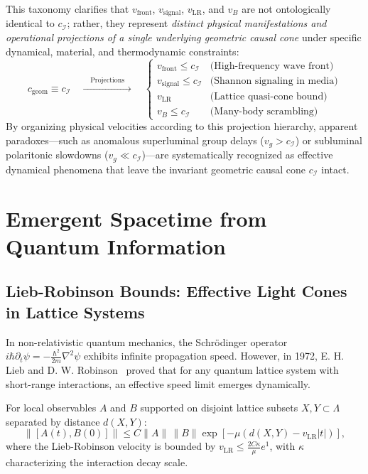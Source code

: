 \documentclass[11pt,a4paper]{article}
\begin{document}
This taxonomy clarifies that $v_{\text{front}}$, $v_{\text{signal}}$, $v_{\text{LR}}$, and $v_B$ are not ontologically identical to $c_{\mathcal{I}}$; rather, they represent \emph{distinct physical manifestations and operational projections of a single underlying geometric causal cone} under specific dynamical, material, and thermodynamic constraints:
\begin{equation}
\boxed{
c_{\text{geom}} \equiv c_{\mathcal{I}} \quad \xrightarrow{\quad\text{Projections}\quad} \quad
\begin{cases}
v_{\text{front}} \le c_{\mathcal{I}} & \text{(High-frequency wave front)} \\
v_{\text{signal}} \le c_{\mathcal{I}} & \text{(Shannon signaling in media)} \\
v_{\text{LR}} & \text{(Lattice quasi-cone bound)} \\
v_B \le c_{\mathcal{I}} & \text{(Many-body scrambling)}
\end{cases}
}
\end{equation}
By organizing physical velocities according to this projection hierarchy, apparent paradoxes—such as anomalous superluminal group delays ($v_g > c_{\mathcal{I}}$) or subluminal polaritonic slowdowns ($v_g \ll c_{\mathcal{I}}$)—are systematically recognized as effective dynamical phenomena that leave the invariant geometric causal cone $c_{\mathcal{I}}$ intact.

\section{Emergent Spacetime from Quantum Information}

\subsection{Lieb-Robinson Bounds: Effective Light Cones in Lattice Systems}

In non-relativistic quantum mechanics, the Schr\"odinger operator $i\hbar \partial_t \psi = -\frac{\hbar^2}{2m}\nabla^2 \psi$ exhibits infinite propagation speed. However, in 1972, E. H. Lieb and D. W. Robinson~\cite{lieb1972} proved that for any quantum lattice system with short-range interactions, an effective speed limit emerges dynamically.

For local observables $A$ and $B$ supported on disjoint lattice subsets $X, Y \subset \Lambda$ separated by distance $d(X, Y)$:
\begin{equation}
\|[A(t), B(0)]\| \le C \|A\|\, \|B\| \exp\left[ -\mu \left( d(X, Y) - v_{\text{LR}} |t| \right) \right],
\end{equation}
where the Lieb-Robinson velocity is bounded by $v_{\text{LR}} \le \frac{2 C \kappa}{\mu} e^1$, with $\kappa$ characterizing the interaction decay scale.
\end{document}

